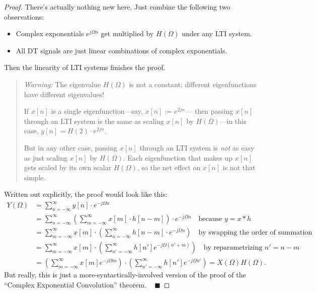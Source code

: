 \begin{proof}
    There's actually nothing new here.
    Just combine the following two observations:
    \begin{itemize}
        \item Complex exponentials $e^{j\Omega n}$
        get multiplied by $H(\Omega)$ under any LTI system.
        \item All DT signals are just
        linear combinations of complex exponentials.
    \end{itemize}
    Then the linearity of LTI systems finishes the proof.

    \begin{quote}
        \textit{Warning:} The eigenvalue $H(\Omega)$ is not a constant;
        different eigenfunctions have different eigenvalues!

        If $x[n]$ is a single eigenfunction---say, $x[n] := e^{2j n}$---
        then passing $x[n]$ through an LTI system
        is the same as scaling $x[n]$ by $H(\Omega)$---in this case,
        $y[n] = H(2) \cdot e^{2jn}$.

        But in any other case,
        passing $x[n]$ through an LTI system is \emph{not} as easy
        as just scaling $x[n]$ by $H(\Omega)$.
        Each eigenfunction that makes up $x[n]$
        gets scaled by its own scalar $H(\Omega)$,
        so the net effect on $x[n]$ is not that simple.
    \end{quote}
    
    Written out explicitly, the proof would look like this:
    \begin{align*}
        Y(\Omega) & = \sum_{n = -\infty}^{\infty} y[n] \cdot e^{-j\Omega n} \\
        & = \sum_{n = -\infty}^{\infty} \left(
            \sum_{m = -\infty}^{\infty} x[m] \cdot h[n - m]
        \right) \cdot e^{-j\Omega n}  ~~~ \text{ because } y = x * h \\
        & = \sum_{m = -\infty}^{\infty} x[m] \cdot \left(
            \sum_{n = -\infty}^{\infty} h[n - m] \cdot e^{-j \Omega n}
        \right) ~~~ \text{ by swapping the order of summation} \\
        & = \sum_{m = -\infty}^{\infty} x[m] \cdot \left(
            \sum_{n' = -\infty}^{\infty} h[n'] e^{-j\Omega(n' + m)}
        \right) ~~~ \text{ by reparametrizing } n' = n - m \\
        & = \left(\sum_{m = -\infty}^{\infty} x[m] e^{-j \Omega m}\right) \cdot
        \left(\sum_{n' = -\infty}^{\infty} h[n'] e^{-j\Omega n'}\right)
        = X(\Omega) H(\Omega).
    \end{align*}
    But really, this is just a
    more-syntactically-involved version of
    the proof of the ``Complex Exponential Convolution'' theorem. ~ $\blacksquare$
\end{proof}

